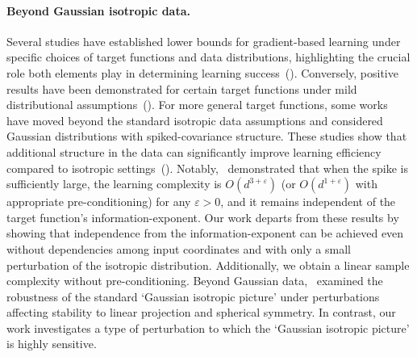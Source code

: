 




\paragraph{Beyond Gaussian isotropic data.}
Several studies have established lower bounds for gradient-based learning under specific choices of target functions and data distributions, highlighting the crucial role both elements play in determining learning success~(\cite{yehudai2020learning,goel2020superpolynomial,shamir2018distribution}). Conversely, positive results have been demonstrated for certain target functions under mild distributional assumptions~(\cite{frei2020agnostic,wu2022learning,song2021cryptographic}).
For more general target functions, some works have moved beyond the standard isotropic data assumptions and considered Gaussian distributions with spiked-covariance structure. These studies show that additional structure in the data can significantly improve learning efficiency compared to isotropic settings~(\cite{ba2024learning,mousavi2023gradient,nitanda2024improved}). Notably,~\cite{mousavi2023gradient} demonstrated that when the spike is sufficiently large, the learning complexity is $O(d^{3+\varepsilon})$ (or $O(d^{1+\varepsilon})$ with appropriate pre-conditioning) for any $\varepsilon > 0$, and it remains independent of the target function's information-exponent.
Our work departs from these results by showing that independence from the information-exponent can be achieved even without dependencies among input coordinates and with only a small perturbation of the isotropic distribution. Additionally, we obtain a linear sample complexity without pre-conditioning.
Beyond Gaussian data,~\cite{zweig2024single} examined the robustness of the standard `Gaussian isotropic picture' under perturbations affecting stability to linear projection and spherical symmetry. In contrast, our work investigates a type of perturbation to which the `Gaussian isotropic picture' is highly sensitive.



